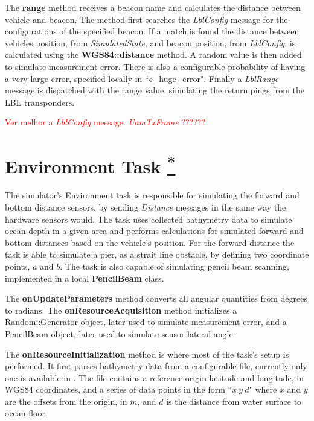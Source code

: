 \documentclass[10pt,a4paper]{article}
\begin{document}
\par The \textbf{range} method receives a beacon name and calculates the distance between vehicle and beacon. The method first searches the \textit{LblConfig} message for the configurations of the specified beacon. If a match is found the distance between vehicles position, from \textit{SimulatedState}, and beacon position, from \textit{LblConfig}, is calculated using the \textbf{WGS84::distance} method. A random value is then added to simulate measurement error. There is also a configurable probability of having a very large error, specified locally in ``c\_huge\_error". Finally a \textit{LblRange} message is dispatched with the range value, simulating the return pings from the LBL transponders.

\par \textcolor{red}{Ver melhor a \textit{LblConfig} message. \textit{UamTxFrame} ??????}


\section{Environment Task \href{https://www.lsts.pt/docs/dune/dune-2017.01.0-dmsmw/db/d16/structSimulators_1_1Environment_1_1Task.html}{\textsuperscript{*}}}

\par The simulator's Environment task is responsible for simulating the forward and bottom distance sensors, by sending \textit{Distance} messages in the same way the hardware sensors would. The task uses collected bathymetry data to simulate ocean depth in a given area and performs calculations for simulated forward and bottom distances based on the vehicle's position. For the forward distance the task is able to simulate a pier, as a strait line obstacle, by defining two coordinate points, $a$ and $b$. The task is also capable of simulating pencil beam scanning, implemented in a local \textbf{PencilBeam} class.

\par The \textbf{onUpdateParameters} method converts all angular quantities from degrees to radians. The \textbf{onResourceAcquisition} method initializes a Random::Generator object, later used to simulate measurement error, and a PencilBeam object, later used to simulate sensor lateral angle.

\par The \textbf{onResourceInitialization} method is where most of the task's setup is performed. It first parses bathymetry data from a configurable file, currently only one is available in . The file contains a reference origin latitude and longitude, in WGS84 coordinates, and a series of data points in the form ``$x\ y\ d$" where $x$ and $y$ are the offsets from the origin, in $m$, and $d$ is the distance from water surface to ocean floor.
\end{document}
